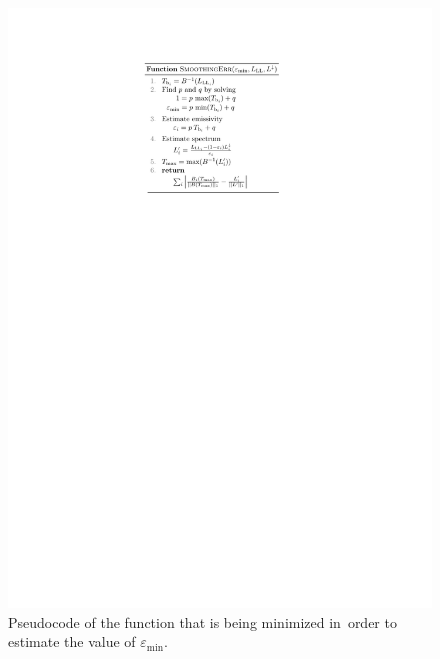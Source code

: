 \begin{figure}[!t]
\centering
\includegraphics[scale=1]{pics/Chapter_03/pseudo_code.pdf}
\vspace{1.5 em}
\caption{Pseudocode of the function that is being minimized in~order to estimate the value of $\varepsilon_\mathrm{min}$.}
\label{fig:FunctionCode}
\end{figure}

